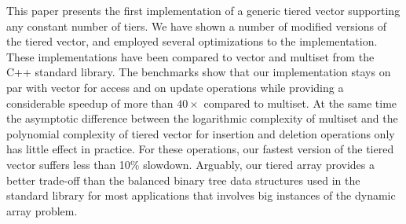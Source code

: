 This paper presents the first implementation of a generic tiered vector
supporting any constant number of tiers.
We have shown a number of modified versions of the tiered vector, and employed several optimizations to the implementation. These implementations have been compared
to vector and multiset from the C++ standard library.
The benchmarks show that our implementation
stays on par with vector for access and on update operations
while providing a considerable speedup of more than $40\times$ compared to multiset. 
At the same time the asymptotic difference between the logarithmic complexity
of multiset and the polynomial complexity of tiered vector
for insertion and deletion operations only has little effect in practice.
For these operations, our fastest version of the tiered vector suffers less than 10\% slowdown.
Arguably, our tiered array provides a better trade-off
than the balanced binary tree data structures used in the standard library for most applications
that involves big instances of the dynamic array problem.
